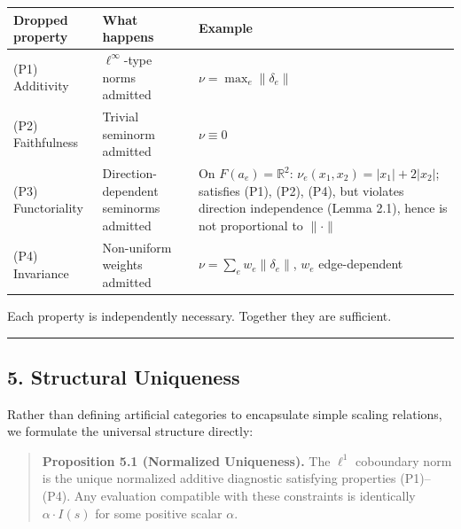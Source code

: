 \documentclass[
]{article}
\begin{document}
\begin{longtable}[]{@{}
  >{\raggedright\arraybackslash}p{}
  >{\raggedright\arraybackslash}p{}
  >{\raggedright\arraybackslash}p{}@{}}
\toprule\noalign{}
\begin{minipage}[b]{\linewidth}\raggedright
Dropped property
\end{minipage} & \begin{minipage}[b]{\linewidth}\raggedright
What happens
\end{minipage} & \begin{minipage}[b]{\linewidth}\raggedright
Example
\end{minipage} \\
\midrule\noalign{}
\endhead
\bottomrule\noalign{}
\endlastfoot
(P1) Additivity & \(\ell^\infty\)-type norms admitted &
\(\nu = \max_e \|\delta_e\|\) \\
(P2) Faithfulness & Trivial seminorm admitted & \(\nu \equiv 0\) \\
(P3) Functoriality & Direction-dependent seminorms admitted & On
\(F(a_e) = \mathbb{R}^2\):
\(\nu_e(x_1, x_2) = \lvert x_1\rvert + 2\lvert x_2\rvert\); satisfies
(P1), (P2), (P4), but violates direction independence (Lemma 2.1), hence
is not proportional to \(\|\cdot\|\) \\
(P4) Invariance & Non-uniform weights admitted &
\(\nu = \sum_e w_e \|\delta_e\|\), \(w_e\) edge-dependent \\
\end{longtable}

Each property is independently necessary. Together they are sufficient.

\begin{center}\rule{0.5\linewidth}{0.5pt}\end{center}

\subsection{5. Structural Uniqueness}\label{structural-uniqueness}

Rather than defining artificial categories to encapsulate simple scaling
relations, we formulate the universal structure directly:

\begin{quote}
\textbf{Proposition 5.1 (Normalized Uniqueness).} The \(\ell^1\)
coboundary norm is the unique normalized additive diagnostic satisfying
properties (P1)--(P4). Any evaluation compatible with these constraints
is identically \(\alpha \cdot I(s)\) for some positive scalar
\(\alpha\).
\end{quote}
\end{document}
